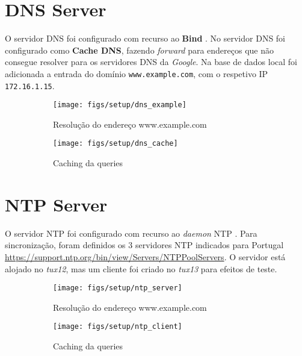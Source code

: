 \pagebreak

\section{DNS Server}

O servidor DNS foi configurado com recurso ao \textbf{Bind} \cite{Bind}.
No servidor DNS foi configurado como \textbf{Cache DNS}, fazendo \textit{forward} para endereços que não consegue resolver para
os servidores DNS da \textit{Google}.
Na base de dados local foi adicionada a entrada do domínio \verb|www.example.com|, com o respetivo IP \verb|172.16.1.15|.

\begin{figure}[H]
    \centering
    \begin{subfigure}[b]{0.49\textwidth}
        \centering
        \texttt{[image: figs/setup/dns\_example]}
        \caption{Resolução do endereço www.example.com}
        \label{fig:dns_example}
    \end{subfigure}
    \hfill
    \begin{subfigure}[b]{0.49\textwidth}
        \centering
        \texttt{[image: figs/setup/dns\_cache]}
        \caption{Caching da queries}
        \label{fig:dns_cache}
    \end{subfigure}
    \caption{}
\end{figure}

\section{NTP Server}

O servidor NTP foi configurado com recurso ao \textit{daemon} NTP \cite{NTP}.
Para sincronização, foram definidos os 3 servidores NTP indicados para Portugal \url{https://support.ntp.org/bin/view/Servers/NTPPoolServers}.
O servidor está alojado no \textit{tux12}, mas um cliente foi criado no \textit{tux13} para efeitos de teste.

\begin{figure}[H]
    \centering
    \begin{subfigure}[b]{0.9\textwidth}
        \centering
        \texttt{[image: figs/setup/ntp\_server]}
        \caption{Resolução do endereço www.example.com}
        \label{fig:ntp_server}
    \end{subfigure}
    \hfill
    \begin{subfigure}[b]{0.9\textwidth}
        \centering
        \texttt{[image: figs/setup/ntp\_client]}
        \caption{Caching da queries}
        \label{fig:ntp_clinte}
    \end{subfigure}
    \caption{}
\end{figure}

